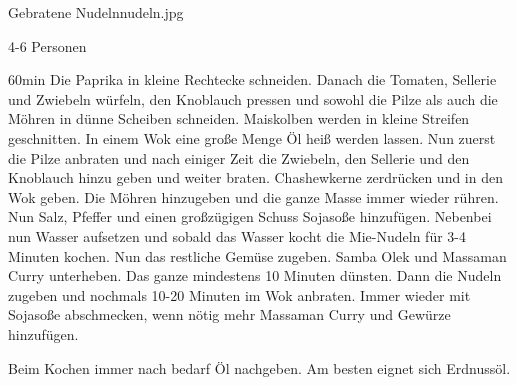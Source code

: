\documentclass[fontsize=11pt,a4paper,toc=bibliography,listof=totoc]{scrbook}
\begin{document}
\begin{Rezept}{Gebratene Nudeln}{nudeln.jpg}		
	\begin{zutaten}{4-6 Personen}
	\end{zutaten}		
	\begin{zubereitung}{60min}
Die Paprika in kleine Rechtecke schneiden. Danach die Tomaten, Sellerie und Zwiebeln würfeln, den Knoblauch pressen und sowohl die Pilze als auch die Möhren in dünne Scheiben schneiden. Maiskolben werden in kleine Streifen geschnitten. In einem Wok eine große Menge Öl heiß werden lassen. Nun zuerst die Pilze anbraten und nach einiger Zeit die Zwiebeln, den Sellerie und den Knoblauch hinzu geben und weiter braten. Chashewkerne zerdrücken und in den Wok geben. Die Möhren hinzugeben und die ganze Masse immer wieder rühren. Nun Salz, Pfeffer und einen großzügigen Schuss Sojasoße hinzufügen. Nebenbei nun Wasser aufsetzen und sobald das Wasser kocht die Mie-Nudeln für 3-4 Minuten kochen. Nun das restliche Gemüse zugeben. Samba Olek und Massaman Curry unterheben. Das ganze mindestens 10 Minuten dünsten. Dann die Nudeln zugeben und nochmals 10-20 Minuten im Wok anbraten. Immer wieder mit Sojasoße abschmecken, wenn nötig mehr Massaman Curry und Gewürze hinzufügen.
		
Beim Kochen immer nach bedarf Öl nachgeben. Am besten eignet sich Erdnussöl.
\end{zubereitung}
\end{Rezept}
\end{document}
